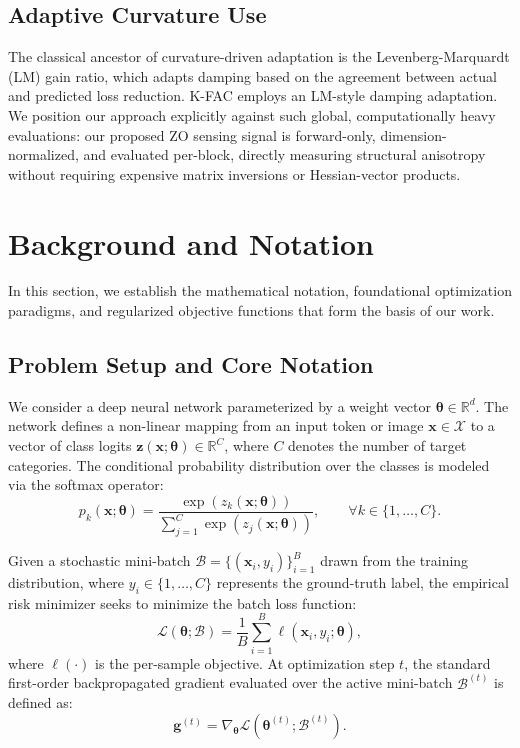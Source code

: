 \documentclass[conference]{IEEEtran}
\begin{document}
\subsection{Adaptive Curvature Use}
The classical ancestor of curvature-driven adaptation is the Levenberg-Marquardt (LM) gain ratio, which adapts damping based on the agreement between actual and predicted loss reduction. K-FAC employs an LM-style damping adaptation. We position our approach explicitly against such global, computationally heavy evaluations: our proposed ZO sensing signal is forward-only, dimension-normalized, and evaluated per-block, directly measuring structural anisotropy without requiring expensive matrix inversions or Hessian-vector products.

\section{Background and Notation}
\label{sec:background}

In this section, we establish the mathematical notation, foundational optimization paradigms, and regularized objective functions that form the basis of our work.

\subsection{Problem Setup and Core Notation}
\label{subsec:notation}

We consider a deep neural network parameterized by a weight vector $\boldsymbol{\theta} \in \mathbb{R}^{d}$. The network defines a non-linear mapping from an input token or image $\mathbf{x} \in \mathcal{X}$ to a vector of class logits $\mathbf{z}(\mathbf{x}; \boldsymbol{\theta}) \in \mathbb{R}^{C}$, where $C$ denotes the number of target categories. The conditional probability distribution over the classes is modeled via the softmax operator:
\begin{equation}
p_k(\mathbf{x}; \boldsymbol{\theta}) = \frac{\exp\left(z_k(\mathbf{x}; \boldsymbol{\theta})\right)}{\sum_{j=1}^{C} \exp\left(z_j(\mathbf{x}; \boldsymbol{\theta})\right)}, \qquad \forall k \in \{1, \dots, C\}.
\label{eq:softmax}
\end{equation}

Given a stochastic mini-batch $\mathcal{B} = \{(\mathbf{x}_i, y_i)\}_{i=1}^{B}$ drawn from the training distribution, where $y_i \in \{1, \dots, C\}$ represents the ground-truth label, the empirical risk minimizer seeks to minimize the batch loss function:
\begin{equation}
\mathcal{L}(\boldsymbol{\theta}; \mathcal{B}) = \frac{1}{B}\sum_{i=1}^{B}\ell(\mathbf{x}_i, y_i; \boldsymbol{\theta}),
\label{eq:batch_loss}
\end{equation}
where $\ell(\cdot)$ is the per-sample objective. At optimization step $t$, the standard first-order backpropagated gradient evaluated over the active mini-batch $\mathcal{B}^{(t)}$ is defined as:
\begin{equation}
\mathbf{g}^{(t)} = \nabla_{\boldsymbol{\theta}} \mathcal{L}(\boldsymbol{\theta}^{(t)}; \mathcal{B}^{(t)}).
\label{eq:full_grad}
\end{equation}
\end{document}
